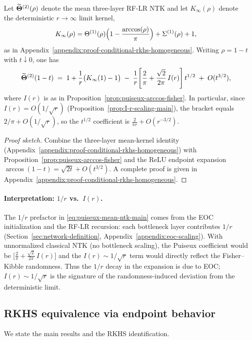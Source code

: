 \begin{corollary}[Puiseux expansion of the mean three-layer NTK near \(\rho=1\)]\label{cor:puiseux-mean-ntk-main}
Let \(\widetilde{\boldsymbol{\Theta}}^{(2)}(\rho)\) denote the mean three-layer RF-LR NTK and let \(K_\infty(\rho)\) denote the deterministic \(r\to\infty\) limit kernel,
\[
K_\infty(\rho)=\Theta^{(1)}(\rho)\Bigl(1-\frac{\arccos(\rho)}{\pi}\Bigr)+\Sigma^{(1)}(\rho)+1,
\]
as in Appendix~\ref{appendix:proof-conditional-rkhs-homogeneous}.
Writing \(\rho=1-t\) with \(t\downarrow 0\), one has
\begin{equation}\label{eq:puiseux-mean-ntk-main}
\widetilde{\boldsymbol{\Theta}}^{(2)}(1-t)
\;=\;
1+\frac{1}{r}\bigl(K_\infty(1)-1\bigr)
\;-\;
\frac{1}{r}\Bigg[\frac{2}{\pi}+\frac{\sqrt{2}}{2\pi}\,I(r)\Bigg]\,t^{1/2}
\;+\; O(t^{3/2}),
\end{equation}
where \(I(r)\) is as in Proposition~\ref{prop:puiseux-arccos-fisher}. In particular, since \(I(r)=O(1/\sqrt{r})\) (Proposition~\ref{prop:I-r-scaling-main}), the bracket equals \(2/\pi+O(1/\sqrt{r})\), so the \(t^{1/2}\) coefficient is \(\frac{2}{\pi r}+O(r^{-3/2})\).
\end{corollary}
\begin{proof}[Proof sketch]
Combine the three-layer mean-kernel identity (Appendix~\ref{appendix:proof-conditional-rkhs-homogeneous}) with Proposition~\ref{prop:puiseux-arccos-fisher} and the ReLU endpoint expansion \(\arccos(1-t)=\sqrt{2t}+O(t^{3/2})\). A complete proof is given in Appendix~\ref{appendix:proof-conditional-rkhs-homogeneous}.
\end{proof}

\paragraph{Interpretation: \(1/r\) vs.\ \(I(r)\).}
The \(1/r\) prefactor in \eqref{eq:puiseux-mean-ntk-main} comes from the EOC initialization and the RF-LR recursion: each bottleneck layer contributes \(1/r\) (Section~\ref{sec:network-definition}, Appendix~\ref{appendix:eoc-scaling}). With unnormalized classical NTK (no bottleneck scaling), the Puiseux coefficient would be \(\big[\frac{2}{\pi}+\frac{\sqrt{2}}{2\pi}\,I(r)\big]\) and the \(I(r)\sim 1/\sqrt{r}\) term would directly reflect the Fisher--Kibble randomness. Thus the \(1/r\) decay in the expansion is due to EOC; \(I(r)\sim 1/\sqrt{r}\) is the signature of the randomness-induced deviation from the deterministic limit.

\subsection{RKHS equivalence via endpoint behavior}\label{subsec:rkhs-bietti-bach}
We state the main results and the RKHS identification.

